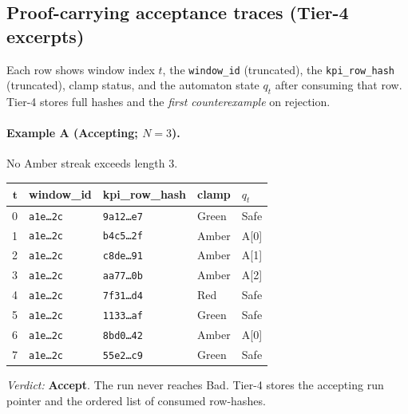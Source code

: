 \documentclass[10pt]{article}
\begin{document}
\subsection{Proof-carrying acceptance traces (Tier-4 excerpts)}
Each row shows window index $t$, the \texttt{window\_id} (truncated), the \texttt{kpi\_row\_hash} (truncated), clamp status, and the automaton state $q_t$ after consuming that row. Tier-4 stores full hashes and the \emph{first counterexample} on rejection.

\paragraph{Example A (Accepting; $N{=}3$).} No \textsf{Amber} streak exceeds length 3.
\begin{center}
\renewcommand{\arraystretch}{1.10}
\begin{tabularx}{\textwidth}{@{} r l l l l @{}}
\toprule
$\bm{t}$ & \textbf{window\_id} & \textbf{kpi\_row\_hash} & \textbf{clamp} & \textbf{$q_t$} \\
\midrule
0 & \texttt{a1e…2c} & \texttt{9a12…e7} & Green & \textsf{Safe} \\
1 & \texttt{a1e…2c} & \texttt{b4c5…2f} & Amber & \textsf{A}[0] \\
2 & \texttt{a1e…2c} & \texttt{c8de…91} & Amber & \textsf{A}[1] \\
3 & \texttt{a1e…2c} & \texttt{aa77…0b} & Amber & \textsf{A}[2] \\
4 & \texttt{a1e…2c} & \texttt{7f31…d4} & Red   & \textsf{Safe} \\
5 & \texttt{a1e…2c} & \texttt{1133…af} & Green & \textsf{Safe} \\
6 & \texttt{a1e…2c} & \texttt{8bd0…42} & Amber & \textsf{A}[0] \\
7 & \texttt{a1e…2c} & \texttt{55e2…c9} & Green & \textsf{Safe} \\
\bottomrule
\end{tabularx}
\end{center}
\emph{Verdict:} \textbf{Accept}. The run never reaches \textsf{Bad}. Tier-4 stores the accepting run pointer and the ordered list of consumed row-hashes.
\end{document}
